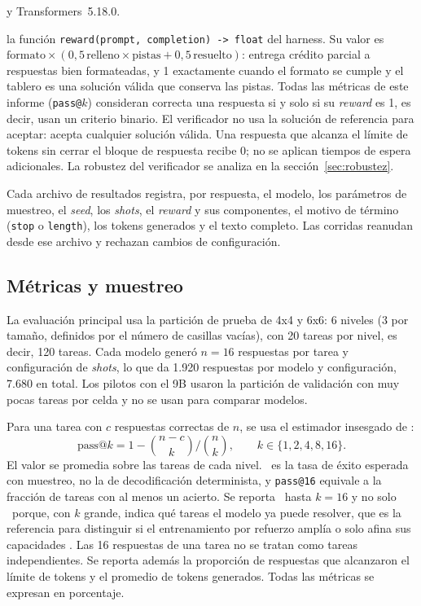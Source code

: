 \begin{description}[leftmargin=0pt]
  y Transformers~5.18.0.
  \item[Verificación:] la función
  \texttt{reward(prompt, completion) -> float} del harness. Su valor es
  $\text{formato} \times (0{,}5\,\text{relleno} \times \text{pistas} +
  0{,}5\,\text{resuelto})$: entrega crédito parcial a respuestas bien
  formateadas, y 1 exactamente cuando el formato se cumple y el tablero es una
  solución válida que conserva las pistas. Todas las métricas de este informe
  (\texttt{pass@}$k$) consideran correcta una respuesta si y solo si su
  \emph{reward} es 1, es decir, usan un criterio binario. El verificador no usa la
  solución de referencia para aceptar: acepta cualquier solución válida. Una
  respuesta que alcanza el límite de tokens sin cerrar el bloque de respuesta
  recibe 0; no se aplican tiempos de espera adicionales. La robustez del
  verificador se analiza en la sección~\ref{sec:robustez}.
\end{description}

Cada archivo de resultados registra, por respuesta, el modelo,
los parámetros de muestreo, el \emph{seed}, los \emph{shots}, el \emph{reward} y
sus componentes, el motivo de término (\texttt{stop} o \texttt{length}), los
tokens generados y el texto completo. Las corridas reanudan desde ese archivo y
rechazan cambios de configuración.

\subsection{Métricas y muestreo}
La evaluación principal usa la partición de prueba de 4x4 y 6x6: 6 niveles
(3 por tamaño, definidos por el número de casillas vacías), con 20 tareas por
nivel, es decir, 120 tareas. Cada modelo generó $n = 16$ respuestas por tarea
y configuración de \emph{shots}, lo que da 1.920 respuestas por modelo y
configuración, 7.680 en total. Los pilotos con el 9B usaron la partición de
validación con muy pocas tareas por celda y no se usan para comparar modelos.

Para una tarea con $c$ respuestas correctas de $n$, se usa el estimador
insesgado de \citet{chen2021codex}:
\[
  \text{pass@}k = 1 - \binom{n-c}{k} \Big/ \binom{n}{k},
  \qquad k \in \{1, 2, 4, 8, 16\}.
\]
El valor se promedia sobre las tareas de cada nivel. \passuno\ es la tasa de
éxito esperada con muestreo, no la de decodificación determinista, y
\texttt{pass@16} equivale a la fracción de tareas con al menos un acierto.
Se reporta \passk\ hasta $k = 16$ y no solo \passuno\ porque, con $k$ grande, indica
qué tareas el modelo ya puede resolver, que es la referencia para distinguir si
el entrenamiento por refuerzo amplía o solo afina sus capacidades
\citep{yue2025limit}. Las 16 respuestas de una tarea no se tratan como tareas independientes. Se
reporta además la proporción de respuestas que alcanzaron el límite de tokens y
el promedio de tokens generados. Todas las métricas se expresan en porcentaje.
